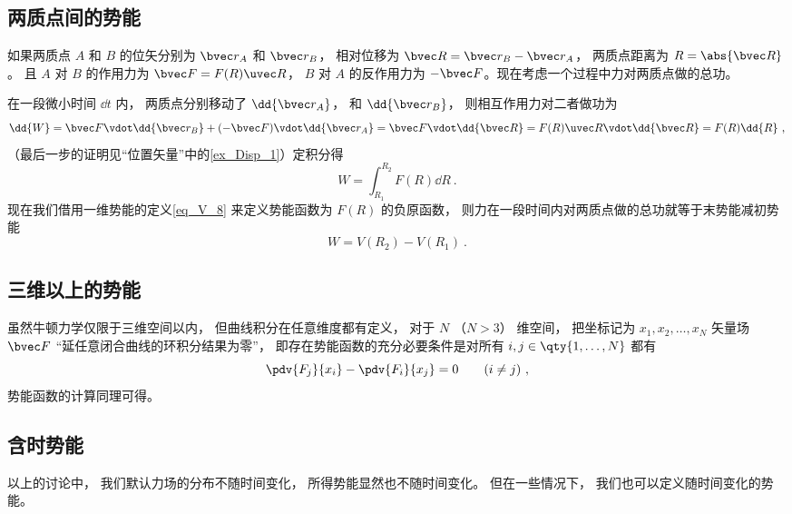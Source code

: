\subsection{两质点间的势能}

如果两质点 $A$ 和 $B$ 的位矢分别为 $\bvec r_A$ 和 $\bvec r_B$， 相对位移为 $\bvec R = \bvec r_B - \bvec r_A$， 两质点距离为 $R = \abs{\bvec R}$。 且 $A$ 对 $B$ 的作用力为 $\bvec F = F(R) \uvec R$， $B$ 对 $A$ 的反作用力为 $-\bvec F$。现在考虑一个过程中力对两质点做的总功。

在一段微小时间 $\dd{t}$ 内， 两质点分别移动了 $\dd{\bvec r_A}$， 和 $\dd{\bvec r_B}$， 则相互作用力对二者做功为
\begin{equation}
\dd{W} = \bvec F \vdot \dd{\bvec r_B} + (- \bvec F) \vdot \dd{\bvec r_A} = \bvec F \vdot \dd{\bvec R}
= F(R)\uvec R\vdot \dd{\bvec R} = F(R) \dd{R}~,
\end{equation}
（最后一步的证明见“位置矢量”中的\autoref{ex_Disp_1}）定积分得
\begin{equation}
W = \int_{R_1}^{R_2}  F(R) \dd{R}~.
\end{equation}
现在我们借用一维势能的定义\autoref{eq_V_8} 来定义势能函数为 $F(R)$ 的负原函数， 则力在一段时间内对两质点做的总功就等于末势能减初势能
\begin{equation}\label{eq_V_20}
W = V(R_2) - V(R_1)~.
\end{equation}

\subsection{三维以上的势能}
虽然牛顿力学仅限于三维空间以内， 但曲线积分在任意维度都有定义， 对于 $N$ （$N > 3$） 维空间， 把坐标记为 $x_1, x_2, \dots, x_N$ 矢量场 $\bvec F$ “延任意闭合曲线的环积分结果为零”， 即存在势能函数的充分必要条件是对所有 $i,j \in \qty{1,\dots, N}$ 都有
\begin{equation}
\pdv{F_j}{x_i} - \pdv{F_i}{x_j} = 0 \qquad (i\ne j)~,
\end{equation}
势能函数的计算同理可得。

\subsection{含时势能}
以上的讨论中， 我们默认力场的分布不随时间变化， 所得势能显然也不随时间变化。 但在一些情况下， 我们也可以定义随时间变化的势能。



